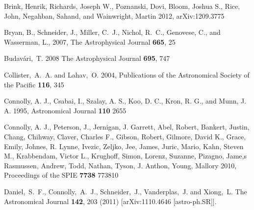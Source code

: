 \documentclass[prd,nofootbib,floatfix,11pt,tightenlines]{revtex4}
\begin{document}
\begin{thebibliography}{99}
Brink, Henrik, Richards, Joseph W., Poznanski, Dovi, Bloom, Joshua S., Rice,
John, Negahban, Sahand, and Wainwright, Martin 2012, arXiv:1209.3775


Bryan, B., Schneider, J., Miller, C.~J., Nichol, R.~C., Genovese, C., and
Wasserman, L., 2007,
The Astrophysical Journal {\bf 665}, 25

Budav\'ari,~T. 2008 The Astrophysical Journal {\bf 695}, 747

Collister,~A.~A. and Lahav,~O. 2004,
Publications of the Astronomical Society of the Pacific {\bf 116}, 345

Connolly, A. J., Csabai, I., Szalay, A. S., Koo, D. C., Kron, R. G.,
and Munn, J. A. 1995, Astronomical Journal {\bf 110} 2655


Connolly, A. J., Peterson, J., Jernigan, J. Garrett, Abel, Robert, Bankert, Justin,
Chang, Chihway, Claver, Charles F., Gibson, Robert, Gilmore, David K., Grace, Emily,
Johnes, R. Lynne, Ivezic, Zeljko, Jee, James, Juric, Mario, Kahn, Steven M.,
Krabbendam, Victor L., Krughoff, Simon, Lorenz, Suzanne, Pizagno, Jame,s Rasmussen,
Andrew, Todd, Nathan, Tyson, J. Anthon, Young, Mallory 2010, Proceedings of the SPIE
{\bf 7738} 773810



  Daniel,~S.~F., Connolly,~A.~J., Schneider,~J., Vanderplas,~J. and Xiong,~L. 
  The Astronomical Journal  {\bf 142}, 203 (2011)
  [arXiv:1110.4646 [astro-ph.SR]].


\end{thebibliography}
\end{document}
